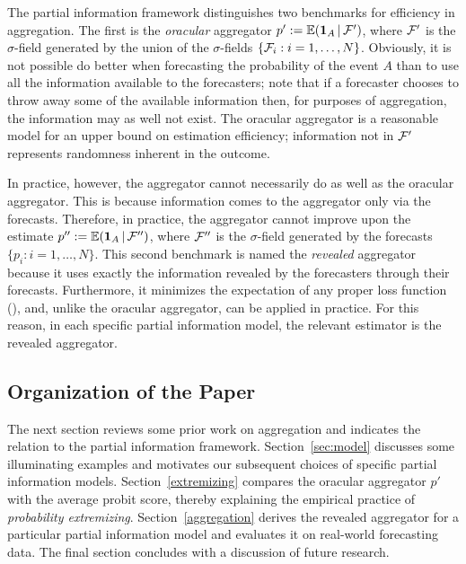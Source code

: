 \documentclass[11pt]{article}
\newcommand{\E}{\mathbb{E}}
\theoremstyle{definition}
\theoremstyle{definition}
\def\one{{\bf 1}}
\def\F{{\cal F}}
\def\E{{\mathbb E}}
\def\|{\, | \,}
\begin{document}
The partial information framework distinguishes two benchmarks for
efficiency in aggregation.  The first is the {\em oracular} aggregator
$p' := \E (\one_A \| \F')$, where $\F'$ is the $\sigma$-field
generated by the union of the $\sigma$-fields $\{ \F_i : i = 1, \dots,
N\}$.  Obviously, it is not possible do better when forecasting the
probability of the event $A$ than to use all the information available
to the forecasters; note that if a forecaster chooses to throw away
some of the available information then, for purposes of aggregation,
the information may as well not exist.  The oracular aggregator is a
reasonable model for an upper bound on estimation efficiency;
information not in $\F'$ represents randomness inherent in the
outcome.

In practice, however, the aggregator cannot necessarily do as well as
the oracular aggregator.  This is because information comes to the
aggregator only via the forecasts. Therefore, in practice, the
aggregator cannot improve upon the estimate $p'' := \E (\one_A \|
\F'')$, where $\F''$ is the $\sigma$-field generated by the forecasts
$\{ p_i : i = 1, \dots, N \}$. This second benchmark is named the {\em
revealed} aggregator because it uses exactly the information revealed
by the forecasters through their forecasts.  Furthermore, it minimizes
the expectation of any proper loss function (\citealt{Ranjan08}), and,
unlike the oracular aggregator, can be applied in practice. For this
reason, in each specific partial information model, the relevant
estimator is the revealed aggregator.


\subsection{Organization of the Paper}

The next section reviews some prior work on aggregation and indicates
the relation to the partial information framework.
Section~\ref{sec:model} discusses some illuminating examples and
motivates our subsequent choices of specific partial information
models.  Section~\ref{extremizing} compares the oracular aggregator
$p'$ with the average probit score, thereby explaining the
empirical practice of {\em probability extremizing}.
Section~\ref{aggregation} derives the revealed aggregator for a
particular partial information model and evaluates it on real-world
forecasting data.  The final section concludes with a discussion of
future research.
\end{document}
